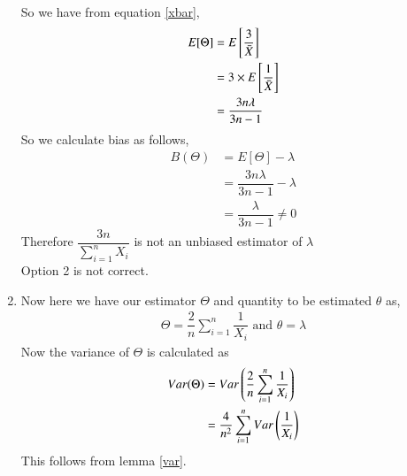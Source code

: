 \documentclass[journal,12pt,twocolumn]{IEEEtran}
\theoremstyle{definition}
\begin{document}
\begin{enumerate}
\begin{align}
\end{align}
So we have from equation \eqref{xbar},
\begin{align}
    E[\Theta] &= E\left[  \dfrac{3}{\Bar{X}}  \right]  \\
    &= 3\times  E \left[  \dfrac{1}{\Bar{X}}  \right] \\
    &= \dfrac{3n\lambda}{3n-1}
\end{align}
So we calculate bias as follows,
\begin{align}
    B(\Theta) & = E[\Theta] - \lambda \\
    &= \dfrac{3n\lambda}{3n-1} - \lambda \\
    &= \dfrac{\lambda}{3n-1} \neq 0
\end{align}
Therefore $ \dfrac{3n}{\sum_{i=1}^{n} X_i } $ is not an unbiased estimator of $ \lambda$ \\
Option 2 is not correct. \\
\item
 Now here we have our estimator $ \Theta$ and quantity to be estimated $ \theta $ as,
 \begin{align}
     \Theta = \dfrac{2}{n} \sum_{i=1}^{n} \dfrac{1}{X_i} \text{  and  }
     \theta = \lambda
 \end{align}
Now the variance of $ \Theta$ is calculated as
\begin{align}
    Var(\Theta) &= Var\left(\dfrac{2}{n} \sum_{i=1}^{n} \dfrac{1}{X_i} \right) \\
    & = \dfrac{4}{n^2} \sum_{i=1}^{n} Var\left(\dfrac{1}{X_i}\right) 
    \label{eq3}
\end{align}
This follows from lemma \ref{var}.


\end{enumerate}
\end{document}
